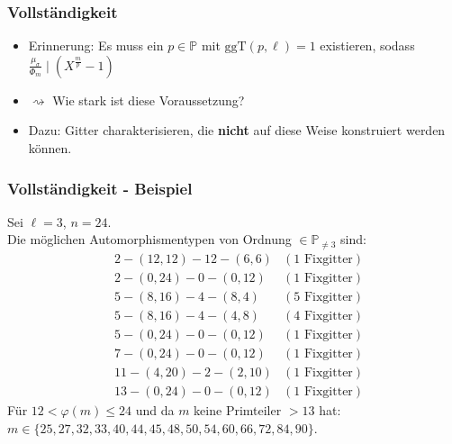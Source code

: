 \documentclass{beamer}
\renewcommand{\P}{\mathbb{P}}
\newcommand{\ggT}{\text{ggT}}
\begin{document}
\begin{frame}[plain]
	\frametitle{Vollständigkeit}
	\begin{itemize}
	\item Erinnerung: Es muss ein $p \in \P$ mit $\ggT(p, \ell) = 1$ existieren, sodass $\frac{\mu_\sigma}{\Phi_m} \mid (X^\frac{m}{p} - 1)$\\
	\pause
	\item $\rightsquigarrow$ Wie stark ist diese Voraussetzung?\\
	\pause
	\item Dazu: Gitter charakterisieren, die \textbf{nicht} auf diese Weise konstruiert werden können.
	\end{itemize}
\end{frame}

\begin{frame}[plain]
	\frametitle{Vollständigkeit - Beispiel}
	Sei $\ell = 3$, $n = 24$.\\
	\pause
	Die möglichen Automorphismentypen von Ordnung $\in \P_{\neq 3}$ sind:\\
	\begin{align*}
		&2 - (12, 12) - 12 - (6, 6)		&(1 \text{ Fixgitter})\\
		&2 - (0, 24) - 0 - (0, 12)		&(1 \text{ Fixgitter})\\
		&5 - (8, 16) - 4 - (8, 4)		&(5 \text{ Fixgitter})\\
		&5 - (8, 16) - 4 - (4, 8) 		&(4 \text{ Fixgitter})\\
		&5 - (0, 24) - 0 - (0, 12) 		&(1 \text{ Fixgitter})\\
		&7 - (0, 24) - 0 - (0, 12) 		&(1 \text{ Fixgitter})\\
		&11 - (4, 20) - 2 - (2, 10) 	&(1 \text{ Fixgitter})\\
		&13 - (0, 24) - 0 - (0, 12) 	&(1 \text{ Fixgitter})
	\end{align*}
	\pause
	Für $12 < \varphi(m) \leq 24$ und da $m$ keine Primteiler $> 13$ hat: $m \in \lbrace 25, 27, 32, 33, 40, 44, 45, 48, 50, 54, 60, 66, 72, 84, 90\rbrace$.
\end{frame}
\end{document}
